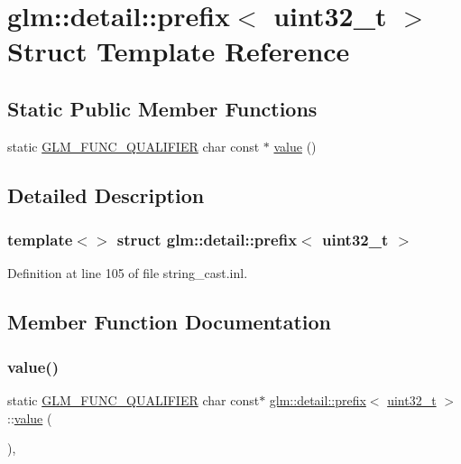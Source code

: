 \hypertarget{structglm_1_1detail_1_1prefix_3_01uint32__t_01_4}{}\section{glm\+::detail\+::prefix$<$ uint32\+\_\+t $>$ Struct Template Reference}
\label{structglm_1_1detail_1_1prefix_3_01uint32__t_01_4}
\subsection*{Static Public Member Functions}
\begin{DoxyCompactItemize}
\item 
static \mbox{\hyperlink{setup_8hpp_a33fdea6f91c5f834105f7415e2a64407}{G\+L\+M\+\_\+\+F\+U\+N\+C\+\_\+\+Q\+U\+A\+L\+I\+F\+I\+ER}} char const  $\ast$ \mbox{\hyperlink{structglm_1_1detail_1_1prefix_3_01uint32__t_01_4_a8a36d8e3a869d300408dde031429352e}{value}} ()
\end{DoxyCompactItemize}


\subsection{Detailed Description}
\subsubsection*{template$<$$>$\newline
struct glm\+::detail\+::prefix$<$ uint32\+\_\+t $>$}



Definition at line 105 of file string\+\_\+cast.\+inl.



\subsection{Member Function Documentation}
\mbox{\label{structglm_1_1detail_1_1prefix_3_01uint32__t_01_4_a8a36d8e3a869d300408dde031429352e}} 
\subsubsection{\texorpdfstring{value()}{value()}}
{\footnotesize\ttfamily static \mbox{\hyperlink{setup_8hpp_a33fdea6f91c5f834105f7415e2a64407}{G\+L\+M\+\_\+\+F\+U\+N\+C\+\_\+\+Q\+U\+A\+L\+I\+F\+I\+ER}} char const$\ast$ \mbox{\hyperlink{structglm_1_1detail_1_1prefix}{glm\+::detail\+::prefix}}$<$ \mbox{\hyperlink{group__gtc__type__precision_ga822ca53a9ad412504532838906276a99}{uint32\+\_\+t}} $>$\+::\mbox{\hyperlink{glad_8h_a03aff08f73d7fde3d1a08e0abd8e84fa}{value}} (\begin{DoxyParamCaption}{ }\end{DoxyParamCaption})\hspace{0.3cm}{\ttfamily [inline]}, {\ttfamily [static]}}



